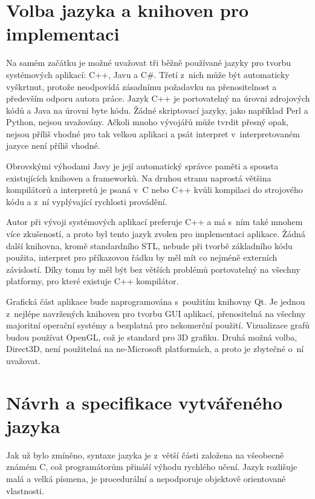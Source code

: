 \documentclass[11pt,twoside,a4paper]{book}
\begin{document}
\section{Volba jazyka a knihoven pro implementaci}

Na samém začátku je možné uvažovat tři běžně používané jazyky pro tvorbu sys\-té\-mo\-vých aplikací: C++, Javu a C\#. Třetí z~nich může být automaticky vyškrtnut, protože neodpovídá zásadnímu požadavku na přenositelnost a především odporu autora práce. Jazyk C++ je portovatelný na úrovni zdrojových kódů a Java na úrovni byte kódu. Žádné skriptovací jazyky, jako například Perl a Python, nejsou uvažovány. Ačkoli mnoho vývojářů může tvrdit přesný opak, nejsou příliš vhodné pro tak velkou aplikaci a psát interpret v~interpretovaném jazyce není příliš vhodné.

Obrovskými výhodami Javy je její automatický správce paměti a spousta existujících knihoven a frameworků. Na druhou stranu naprostá většina kompilátorů a interpretů je psaná v~C nebo C++ kvůli kompilaci do strojového kódu a z~ní vyplývající rychlosti provádění.

Autor při vývoji systémových aplikací preferuje C++ a má s~ním také mnohem více zku\-še\-no\-stí, a proto byl tento jazyk zvolen pro implementaci aplikace. Žádná další knihovna, kromě standardního STL, nebude při tvorbě základního kódu použita, interpret pro příkazovou řádku by měl mít co nejméně externích závislostí. Díky tomu by měl být bez větších problémů portovatelný na všechny platformy, pro které existuje C++ kompilátor.

Grafická část aplikace bude naprogramována s~použitím knihovny Qt. Je jednou z~nejlépe navržených knihoven pro tvorbu GUI aplikací, přenositelná na všechny majoritní operační systémy a bezplatná pro nekomerční použití. Vizualizace grafů budou používat OpenGL, což je standard pro 3D grafiku. Druhá možná volba, Direct3D, není použitelná na ne-Microsoft platformách, a proto je zbytečné o~ní uvažovat.


\section{Návrh a specifikace vytvářeného jazyka}

Jak už bylo zmíněno, syntaxe jazyka je z~větší části založena na všeobecně známém C, což programátorům přináší výhodu rychlého učení. Jazyk rozlišuje malá a velká písmena, je procedurální a nepodporuje objektově orientované vlastnosti.
\end{document}
